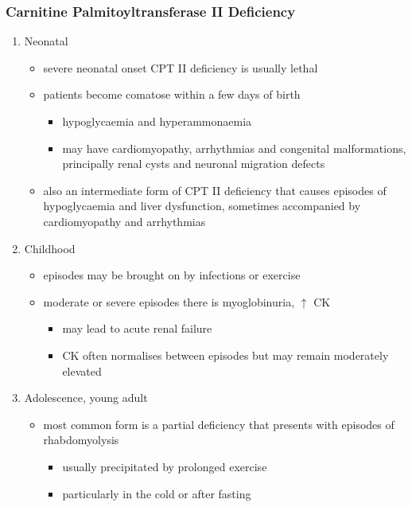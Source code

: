 \documentclass{scrartcl}
\begin{document}
\subsubsection{Carnitine Palmitoyltransferase II Deficiency}
\label{sec:orgf22c9bc}
\begin{enumerate}
\item Neonatal
\label{sec:orgb4dd9dd}
\begin{itemize}
\item severe neonatal onset CPT II deficiency is usually lethal
\item patients become comatose within a few days of birth
\begin{itemize}
\item hypoglycaemia and hyperammonaemia
\item may have cardiomyopathy, arrhythmias and congenital malformations,
principally renal cysts and neuronal migration defects
\end{itemize}
\item also an intermediate form of CPT II deficiency that causes
episodes of hypoglycaemia and liver dysfunction, sometimes
accompanied by cardiomyopathy and arrhythmias
\end{itemize}

\item Childhood
\label{sec:org6690251}
\begin{itemize}
\item episodes may be brought on by infections or exercise
\item moderate or severe episodes there is myoglobinuria, \(\uparrow\) CK
\begin{itemize}
\item may lead to acute renal failure
\item CK often normalises between episodes but may remain moderately
elevated
\end{itemize}
\end{itemize}

\item Adolescence,  young adult
\label{sec:org0066e36}
\begin{itemize}
\item most common form is a partial deficiency that presents with
episodes of rhabdomyolysis
\begin{itemize}
\item usually precipitated by prolonged exercise
\item particularly in the cold or after fasting
\end{itemize}
\end{itemize}
\end{enumerate}
\end{document}
